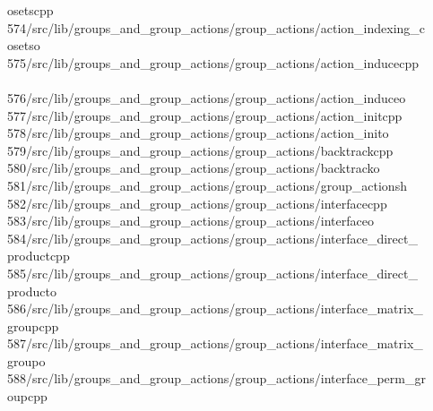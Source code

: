 \begin{tabbing}
\>osetscpp\\[0pt]
574\>/src/lib/groups\_and\_group\_actions/group\_actions/action\_indexing\_c\\[0pt]
\>osetso\\[0pt]
575\>/src/lib/groups\_and\_group\_actions/group\_actions/action\_inducecpp\\[0pt]
\>\\[0pt]
576\>/src/lib/groups\_and\_group\_actions/group\_actions/action\_induceo\\[0pt]
577\>/src/lib/groups\_and\_group\_actions/group\_actions/action\_initcpp\\[0pt]
578\>/src/lib/groups\_and\_group\_actions/group\_actions/action\_inito\\[0pt]
579\>/src/lib/groups\_and\_group\_actions/group\_actions/backtrackcpp\\[0pt]
580\>/src/lib/groups\_and\_group\_actions/group\_actions/backtracko\\[0pt]
581\>/src/lib/groups\_and\_group\_actions/group\_actions/group\_actionsh\\[0pt]
582\>/src/lib/groups\_and\_group\_actions/group\_actions/interfacecpp\\[0pt]
583\>/src/lib/groups\_and\_group\_actions/group\_actions/interfaceo\\[0pt]
584\>/src/lib/groups\_and\_group\_actions/group\_actions/interface\_direct\_\\[0pt]
\>productcpp\\[0pt]
585\>/src/lib/groups\_and\_group\_actions/group\_actions/interface\_direct\_\\[0pt]
\>producto\\[0pt]
586\>/src/lib/groups\_and\_group\_actions/group\_actions/interface\_matrix\_\\[0pt]
\>groupcpp\\[0pt]
587\>/src/lib/groups\_and\_group\_actions/group\_actions/interface\_matrix\_\\[0pt]
\>groupo\\[0pt]
588\>/src/lib/groups\_and\_group\_actions/group\_actions/interface\_perm\_gr\\[0pt]
\>oupcpp\\[0pt]

\end{tabbing}
